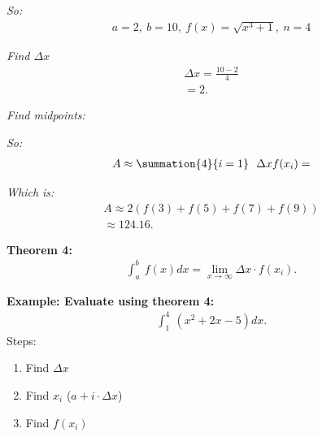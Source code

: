 \documentclass{report}
\begin{document}
\bigbreak \noindent
\textit{So:}
\begin{align*}
  a=2,\ b=10,\ f(x) = \sqrt{x^{3}+1},\ n=4
\end{align*}

\bigbreak \noindent 
\textit{Find $\Delta x$}
\begin{align*}
  \Delta x = \frac{10-2}{4} \\
  = 2
.\end{align*}

\bigbreak \noindent
\textit{Find midpoints:}

\begin{figure}[ht]
  \centering
  \label{fig:midpointfig}
\end{figure}

\bigbreak \noindent 
\textit{So:}
\begin{align*}
  A \approx \summation{4}{i=1}\ \ \Delta xf(x_{i})=
\end{align*}

\bigbreak \noindent 
\textit{Which is:}
\begin{align*}
  A \approx 2(f(3)+f(5)+f(7)+f(9)) \\
  \boxed{\approx 124.16}
.\end{align*}

\begin{mdframed}
  \textbf{Theorem 4:}
  \begin{align*}
    \int_{a}^{b}\ f(x)dx = \lim\limits_{x \to \infty}{\Delta x \cdot f(x_{i})}
  .\end{align*}
\end{mdframed}

\bigbreak \noindent 
\begin{mdframed}
  \textbf{Example: Evaluate using theorem 4:}
  \begin{align*}
    \int_{1}^{4}\ (x^{2} +2x-5)dx   
  .\end{align*}
  \bigbreak \noindent 
  Steps:
  \begin{enumerate}
    \item Find $\Delta x $
    \item Find $x_{i}$ ($a + i \cdot \Delta x $)
    \item Find $f(x_{i})$
  \end{enumerate}
\end{mdframed}
\end{document}
